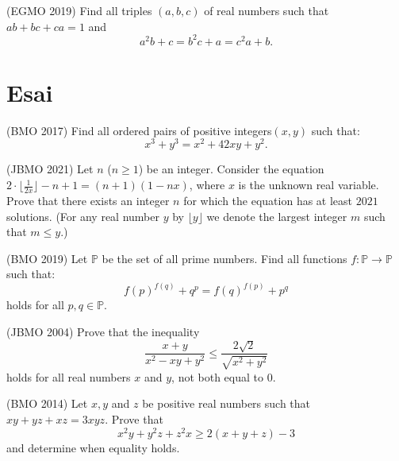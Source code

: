 \documentclass[12pt]{scrartcl}
\begin{document}
        \begin{soalbaru}(EGMO 2019)
    Find all triples $(a, b, c)$ of real numbers such that $ab + bc + ca = 1$ and $$a^2b + c = b^2c + a = c^2a + b.$$
    \end{soalbaru}
    
    \section{Esai}
    \begin{soalbaru}(BMO 2017)
    Find all ordered pairs of positive integers$ (x, y)$ such that:$$x^3+y^3=x^2+42xy+y^2.$$
    \end{soalbaru}
    
    \begin{soalbaru}(JBMO 2021)
    Let $n$ ($n \ge 1$) be an integer. Consider the equation $2\cdot \lfloor{\frac{1}{2x}}\rfloor - n + 1 = (n + 1)(1 - nx)$, where $x$ is the unknown real variable. Prove that there exists an integer $n$ for which the equation has at least $2021$ solutions. (For any real number $y$ by $\lfloor{y} \rfloor$ we denote the largest integer $m$ such that $m \le y$.)
    \end{soalbaru}
    
    \begin{soalbaru}(BMO 2019)
    Let $\mathbb{P}$ be the set of all prime numbers. Find all functions $f:\mathbb{P}\rightarrow\mathbb{P}$ such that:
$$f(p)^{f(q)}+q^p=f(q)^{f(p)}+p^q$$holds for all $p,q\in\mathbb{P}$.
    \end{soalbaru}

    
    \begin{soalbaru}(JBMO 2004)
    Prove that the inequality\[ \frac{ x+y}{x^2-xy+y^2 } \leq \frac{ 2\sqrt 2 }{\sqrt{ x^2 +y^2 } } \]holds for all real numbers $x$ and $y$, not both equal to 0.
    \end{soalbaru}
    
    \begin{soalbaru}(BMO 2014)
    Let $x,y$ and $z$ be positive real numbers such that $xy+yz+xz=3xyz$. Prove that\[ x^2y+y^2z+z^2x \ge 2(x+y+z)-3 \]and determine when equality holds.
    \end{soalbaru}
\end{document}
